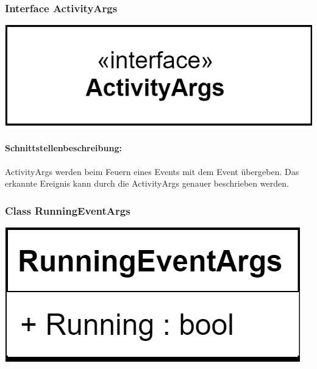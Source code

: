 \documentclass[a4paper,12pt]{article}
\begin{document}
	
	\begin{minipage}[b]{0.6\textwidth}
		\subsubsection{Interface ActivityArgs}
		\end{minipage}
		\begin{minipage}[c]{0.5\textwidth}
			\includegraphics{bilder/EMKlassen/ActivityArgsInterface.png}
		\end{minipage}
		
	\paragraph{Schnittstellenbeschreibung:}
	ActivityArgs werden beim Feuern eines Events mit dem Event übergeben. Das erkannte Ereignis kann durch die ActivityArgs genauer beschrieben werden.\\
	
	\begin{minipage}[b]{0.6\textwidth}
		\subsubsection{Class RunningEventArgs}
		\end{minipage}
		\begin{minipage}[c]{0.5\textwidth}
			\includegraphics{bilder/EMKlassen/RunningEventArgsClass.png}
		\end{minipage}
		
\end{document}
